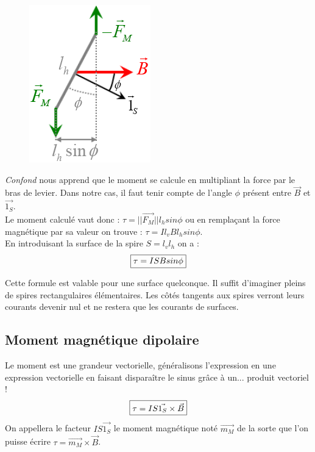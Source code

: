 \documentclass	[11pt, a4paper, openany]{book}
\begin{document}
\begin{figure}
\includegraphics[scale=0.50]{magneto/image14.png}
\end{figure}

\textit{Confond} nous apprend que le moment se calcule en multipliant la force par le bras de levier. Dans notre cas, il faut tenir compte de l'angle $\phi$ présent entre $\vec{B}$ et $\vec{1_S}$.\\



Le moment calculé vaut donc : $\tau = ||\vec{F_M}||l_h sin\phi$ ou en remplaçant la force magnétique par sa valeur on trouve : $\tau = I l_v B l_h sin\phi$.\\
En introduisant la surface de la spire $ S = l_v l_h$ on a :
\begin{equation}
\fbox{$\tau = ISBsin\phi$}
\end{equation}

Cette formule est valable pour une surface quelconque. Il suffit d'imaginer pleins de spires rectangulaires élémentaires. Les côtés tangents aux spires verront leurs courants devenir nul et ne restera que les courants de surfaces.
\subsection{Moment magnétique dipolaire}
Le moment est une grandeur vectorielle, généralisons l'expression en une expression vectorielle en faisant disparaître le sinus grâce à un... produit vectoriel !
\begin{equation}
\fbox{$\tau = IS\vec{1_S} \times \vec{B}$}
\end{equation}
On appellera le facteur $IS\vec{1_S}$ le moment magnétique noté $\vec{m_M}$ de la sorte que l'on puisse écrire $\tau = \vec{m_M} \times \vec{B}$.
\end{document}
